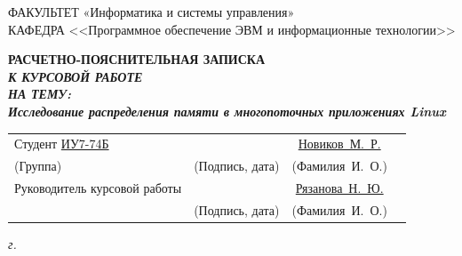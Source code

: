 \begin{titlepage}
	{\doublespacing \small \raggedright ФАКУЛЬТЕТ \hspace{28mm} «Информатика и системы управления» \\
		КАФЕДРА \hspace{9mm} <<Программное обеспечение ЭВМ и информационные технологии>> \\}
	
	\vspace{20mm}
	
	{\large \bfseries РАСЧЕТНО-ПОЯСНИТЕЛЬНАЯ ЗАПИСКА \\
	{\itshape К КУРСОВОЙ РАБОТЕ \\ НА ТЕМУ: \\
	Исследование распределения памяти в многопоточных приложениях Linux\\}}
	
	\vspace{70mm}
	
	\begin{tabular}{p{} c c c}
		Студент \underline{ ИУ7-74Б } &
		\underline{\hspace{35mm}} &
		\underline{ Новиков~М.~Р. } \\[-0.6em]
		
		{\hspace{23.5mm} \scriptsize (Группа)} &
		{\scriptsize (Подпись, дата)} &
		{\scriptsize (Фамилия~И.~О.)} \\
		
		Руководитель курсовой работы &
		\underline{\hspace{35mm}} &
		\underline{Рязанова~Н.~Ю.} \\[-0.6em]
		
		&
		{\scriptsize (Подпись, дата)} &
		{\scriptsize (Фамилия~И.~О.)} \\
	\end{tabular}
	
	\vfill
	
	\textit{{\the\year} г.}
\end{titlepage}

\setcounter{page}{2}